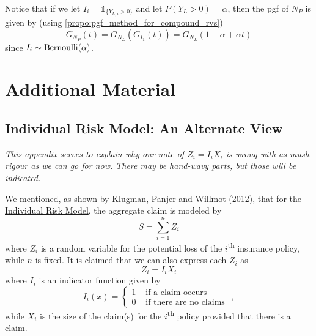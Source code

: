 \documentclass[notoc,notitlepage]{tufte-book}
\begin{document}
Notice that if we let $I_i = \mathbb{1}_{\{ Y_{L, i} > 0 \}}$ and let $P(Y_L > 0) = \alpha$, then the pgf of $N_P$ is given by (using \cref{propo:pgf_method_for_compound_rvs})
\begin{equation*}
  G_{N_P}(t) = G_{N_L}( G_{I_1}(t) ) = G_{N_L}(1 - \alpha + \alpha t)
\end{equation*}
since $I_i \sim \operatorname{Bernoulli}(\alpha)$.





\appendix

\chapter{Additional Material}%
\label{chp:additional_material}

\section{Individual Risk Model: An Alternate View}%
\label{sec:individual_risk_model_an_alternate_view}

\textit{This appendix serves to explain why our note of $Z_i = I_i X_i$ is wrong with as mush rigour as we can go for now. There may be hand-wavy parts, but those will be indicated.} 

We mentioned, as shown by Klugman, Panjer and Willmot (2012)\cite{KlugmanPanjerWillmot2012}, that for the \hyperref[defn:individual_risk_model]{Individual Risk Model}, the aggregate claim is modeled by
\begin{equation*}
  S = \sum_{i=1}^{n} Z_i
\end{equation*}
where $Z_i$ is a random variable for the potential loss of the $i$\textsuperscript{th} insurance policy, while $n$ is fixed. It is claimed that we can also express each $Z_i$ as
\begin{equation*}
  Z_i = I_i X_i
\end{equation*}
where $I_i$ is an indicator function given by
\begin{equation*}
  I_i(x) = \begin{cases}
    1 & \text{ if a claim occurs } \\
    0 & \text{ if there are no claims }
  \end{cases},
\end{equation*}
while $X_i$ is the size of the claim(s) for the $i$\textsuperscript{th} policy provided that there is a claim.
\end{document}
